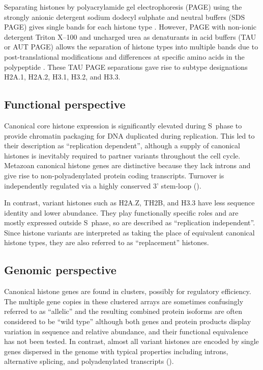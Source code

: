     Separating histones by polyacrylamide gel electrophoresis (PAGE)
    using the strongly anionic detergent sodium dodecyl sulphate and neutral buffers (SDS PAGE)
    gives single bands for each histone type \citep{ShechterHake2007}.
    However, PAGE with non-ionic detergent Triton X--100 and uncharged urea as denaturants
    in acid buffers (TAU or AUT PAGE) allows the separation
    of histone types into multiple bands
    due to post-translational modifications and differences at specific amino acids
    in the polypeptide \citep{Zweidler1977}.
    These TAU PAGE separations gave rise to subtype designations
    H2A.1, H2A.2, H3.1, H3.2, and H3.3.

  \subsection{Functional perspective}

    Canonical core histone expression
    is significantly elevated during S~phase to provide chromatin packaging
    for DNA duplicated during replication.
    This led to their description as ``replication dependent'',
    although a supply of canonical histones is inevitably required
    to partner variants throughout the cell cycle.
    Metazoan canonical histone genes are distinctive
    because they lack introns and give rise to non-polyadenylated protein coding transcripts.
    Turnover is independently regulated via a highly
    conserved 3' stem-loop ().

    In contrast, variant histones such as H2A.Z, TH2B, and H3.3 have
    less sequence identity and lower abundance.
    They play functionally specific roles and are mostly expressed outside S~phase,
    so are described as ``replication independent''.
    Since histone variants are interpreted as taking the place
    of equivalent canonical histone types,
    they are also referred to as ``replacement'' histones.

  \subsection{Genomic perspective}

    Canonical histone genes are found in \NumberOfClusters{} clusters,
    possibly for regulatory efficiency.
    The multiple gene copies in these clustered arrays are
    sometimes confusingly referred to as ``allelic''
    and the resulting combined protein isoforms are often considered to be ``wild type''
    although both genes and protein products display
    variation in sequence and relative abundance,
    and their functional equivalence has not been tested.
    In contrast, almost all variant histones are encoded by single genes dispersed in the genome
    with typical properties including introns, alternative splicing,
    and polyadenylated transcripts ().

